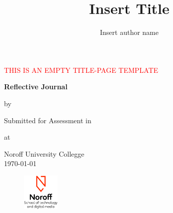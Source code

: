 \begin{titlepage}

  \begin{center}

    \textcolor{red}{\Huge{THIS IS AN EMPTY TITLE-PAGE TEMPLATE}} %


      {\bfseries{\Huge{Reflective Journal}}}


      {\Large{by}}

    \begin{author}
      \author{\Large{Insert author name}}
    \end{author}


    \vspace*{2.5cm}
    Submitted for Assessment in


    \begin{title}
        \title{\bfseries{\huge{Insert Title}}}
    \end{title}

    \vspace*{2.5cm}
    at


    \Large{Noroff University Collegge\\
    \today}

    \vfill


    \begin{figure}[h!]
      \centering
      \includegraphics[height=50pt]{Noroff-Logo.png}
    \end{figure}


  \end{center}
\end{titlepage}
